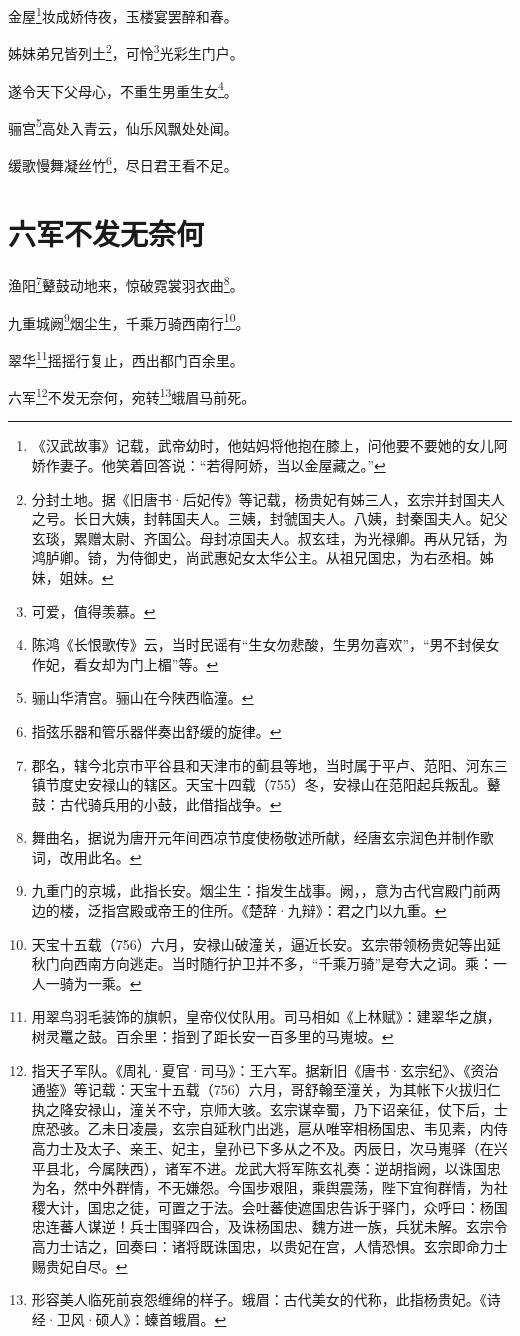 \documentclass{article}
\begin{document}
金屋\footnote{《汉武故事》记载，武帝幼时，他姑妈将他抱在膝上，问他要不要她的女儿阿娇作妻子。他笑着回答说：“若得阿娇，当以金屋藏之。”}妆成娇侍夜，玉楼宴罢醉和春。

姊妹弟兄皆列土\footnote{分封土地。据《旧唐书·后妃传》等记载，杨贵妃有姊三人，玄宗并封国夫人之号。长日大姨，封韩国夫人。三姨，封虢国夫人。八姨，封秦国夫人。妃父玄琰，累赠太尉、齐国公。母封凉国夫人。叔玄珪，为光禄卿。再从兄铦，为鸿胪卿。锜，为侍御史，尚武惠妃女太华公主。从祖兄国忠，为右丞相。姊妹，姐妹。}，可怜\footnote{可爱，值得羡慕。}光彩生门户。

遂令天下父母心，不重生男重生女\footnote{陈鸿《长恨歌传》云，当时民谣有“生女勿悲酸，生男勿喜欢”，“男不封侯女作妃，看女却为门上楣”等。}。

骊宫\footnote{骊山华清宫。骊山在今陕西临潼。}高处入青云，仙乐风飘处处闻。

缓歌慢舞凝丝竹\footnote{指弦乐器和管乐器伴奏出舒缓的旋律。}，尽日君王看不足。

\section{六军不发无奈何}

渔阳\footnote{郡名，辖今北京市平谷县和天津市的蓟县等地，当时属于平卢、范阳、河东三镇节度史安禄山的辖区。天宝十四载（755）冬，安禄山在范阳起兵叛乱。鼙鼓：古代骑兵用的小鼓，此借指战争。}鼙鼓动地来，惊破霓裳羽衣曲\footnote{舞曲名，据说为唐开元年间西凉节度使杨敬述所献，经唐玄宗润色并制作歌词，改用此名。}。

九重城阙\footnote{九重门的京城，此指长安。烟尘生：指发生战事。阙，，意为古代宫殿门前两边的楼，泛指宫殿或帝王的住所。《楚辞·九辩》：君之门以九重。}烟尘生，千乘万骑西南行\footnote{天宝十五载（756）六月，安禄山破潼关，逼近长安。玄宗带领杨贵妃等出延秋门向西南方向逃走。当时随行护卫并不多，“千乘万骑”是夸大之词。乘：一人一骑为一乘。}。

翠华\footnote{用翠鸟羽毛装饰的旗帜，皇帝仪仗队用。司马相如《上林赋》：建翠华之旗，树灵鼍之鼓。百余里：指到了距长安一百多里的马嵬坡。}摇摇行复止，西出都门百余里。

六军\footnote{指天子军队。《周礼·夏官·司马》：王六军。据新旧《唐书·玄宗纪》、《资治通鉴》等记载：天宝十五载（756）六月，哥舒翰至潼关，为其帐下火拔归仁执之降安禄山，潼关不守，京师大骇。玄宗谋幸蜀，乃下诏亲征，仗下后，士庶恐骇。乙未日凌晨，玄宗自延秋门出逃，扈从唯宰相杨国忠、韦见素，内侍高力士及太子、亲王、妃主，皇孙已下多从之不及。丙辰日，次马嵬驿（在兴平县北，今属陕西），诸军不进。龙武大将军陈玄礼奏：逆胡指阙，以诛国忠为名，然中外群情，不无嫌怨。今国步艰阻，乘舆震荡，陛下宜徇群情，为社稷大计，国忠之徒，可置之于法。会吐蕃使遮国忠告诉于驿门，众呼曰：杨国忠连蕃人谋逆！兵士围驿四合，及诛杨国忠、魏方进一族，兵犹未解。玄宗令高力士诘之，回奏曰：诸将既诛国忠，以贵妃在宫，人情恐惧。玄宗即命力士赐贵妃自尽。}不发无奈何，宛转\footnote{形容美人临死前哀怨缠绵的样子。蛾眉：古代美女的代称，此指杨贵妃。《诗经·卫风·硕人》：螓首蛾眉。}蛾眉马前死。
\end{document}
